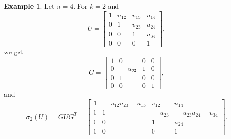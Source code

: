 \documentclass[11pt, letterpaper]{amsart}
\theoremstyle{definition}
\newtheorem{example}[theorem]{Example}
\numberwithin{equation}{section}
\begin{document}
\begin{example}
\label{eg:U4x4}
Let $n=4$. For $k=2$ and 
\begin{equation}
\label{eq:U4u}
U=\begin{bmatrix}
1 & u_{12} & u_{13} & u_{14} \\
0 & 1 & u_{23} & u_{24} \\
0 & 0 & 1 & u_{34} \\
0 & 0 & 0 & 1
\end{bmatrix}\!\!,
\end{equation}
we get
\begin{equation*}
G=\begin{bmatrix}
1 & 0 & 0 & 0 \\
0 & \!\!-u_{2 3}\!\! & 1 & 0 \\
0 & 1 & 0 & 0 \\
0 & 0 & 0 & 1
\end{bmatrix}\!\!,
\end{equation*}
and
\begin{equation}
\label{eq:U'4u}
\sigma_2(U)=GUG^T= %
\begin{bmatrix}
1 & \!\!-u_{12}u_{23}+u_{13}\! & u_{12} & u_{14} \\
0 & 1 & \!-u_{23}\! & \!-u_{23}u_{24}+u_{34} \\
0 & 0 & 1 & u_{24} \\
0 & 0 & 0 & 1
\end{bmatrix}\!\!. 
\end{equation}
\end{example}
\end{document}

